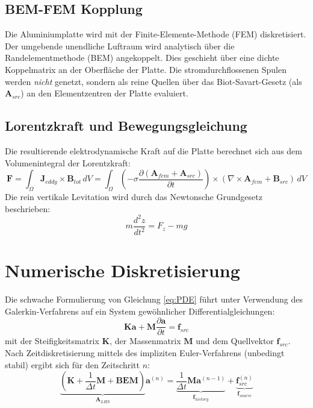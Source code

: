 \documentclass[11pt, a4paper]{article}
\begin{document}
\subsection{BEM-FEM Kopplung}
Die Aluminiumplatte wird mit der Finite-Elemente-Methode (FEM) diskretisiert. Der umgebende unendliche Luftraum wird analytisch über die Randelementmethode (BEM) angekoppelt. Dies geschieht über eine dichte Koppelmatrix an der Oberfläche der Platte. Die stromdurchflossenen Spulen werden \textit{nicht} genetzt, sondern als reine Quellen über das Biot-Savart-Gesetz (als $\mathbf{A}_{src}$) an den Elementzentren der Platte evaluiert.

\subsection{Lorentzkraft und Bewegungsgleichung}
Die resultierende elektrodynamische Kraft auf die Platte berechnet sich aus dem Volumenintegral der Lorentzkraft:
\begin{equation}
    \mathbf{F} = \int_{\Omega} \mathbf{J}_{eddy} \times \mathbf{B}_{tot} \, dV = \int_{\Omega} \left( -\sigma \frac{\partial (\mathbf{A}_{fem} + \mathbf{A}_{src})}{\partial t} \right) \times (\nabla \times \mathbf{A}_{fem} + \mathbf{B}_{src}) \, dV
\end{equation}
Die rein vertikale Levitation wird durch das Newtonsche Grundgesetz beschrieben:
\begin{equation}
    m \frac{d^2 z}{dt^2} = F_z - m g
\end{equation}

\section{Numerische Diskretisierung}

Die schwache Formulierung von Gleichung \eqref{eq:PDE} führt unter Verwendung des Galerkin-Verfahrens auf ein System gewöhnlicher Differentialgleichungen:
\begin{equation}
    \mathbf{K} \mathbf{a} + \mathbf{M} \frac{\partial \mathbf{a}}{\partial t} = \mathbf{f}_{src}
\end{equation}
mit der Steifigkeitsmatrix $\mathbf{K}$, der Massenmatrix $\mathbf{M}$ und dem Quellvektor $\mathbf{f}_{src}$. Nach Zeitdiskretisierung mittels des impliziten Euler-Verfahrens (unbedingt stabil) ergibt sich für den Zeitschritt $n$:
\begin{equation}
    \underbrace{\left( \mathbf{K} + \frac{1}{\Delta t} \mathbf{M} + \mathbf{BEM} \right)}_{\mathbf{A}_{LHS}} \mathbf{a}^{(n)} = \underbrace{\frac{1}{\Delta t} \mathbf{M} \mathbf{a}^{(n-1)}}_{\mathbf{f}_{history}} + \underbrace{\mathbf{f}_{src}^{(n)}}_{\mathbf{f}_{source}}
    \label{eq:System}
\end{equation}
\end{document}
